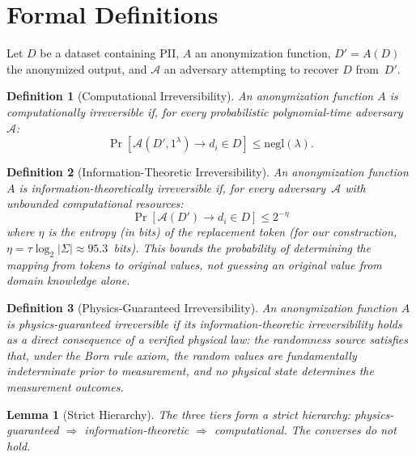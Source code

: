 \documentclass[acmsmall,screen,review,anonymous]{acmart}
\newtheorem{lemma}[theorem]{Lemma}
\newtheorem{definition}{Definition}
\begin{document}
\section{Formal Definitions}
\label{sec:definitions}

Let $D$ be a dataset containing PII, $A$ an anonymization function, $D' = A(D)$ the anonymized output, and $\mathcal{A}$ an adversary attempting to recover $D$ from~$D'$.

\begin{definition}[Computational Irreversibility]
\label{def:comp}
An anonymization function $A$ is \emph{computationally irreversible} if, for every probabilistic polynomial-time adversary $\mathcal{A}$:
\begin{equation}
\Pr[\mathcal{A}(D', 1^\lambda) \to d_i \in D] \leq \mathrm{negl}(\lambda).
\label{eq:comp_irrev}
\end{equation}
\end{definition}

\begin{definition}[Information-Theoretic Irreversibility]
\label{def:it}
An anonymization function~$A$ is \emph{information-theoretically irreversible} if, for every adversary~$\mathcal{A}$ with unbounded computational resources:
\begin{equation}
\Pr[\mathcal{A}(D') \to d_i \in D] \leq 2^{-\eta}
\label{eq:it_irrev}
\end{equation}
where $\eta$ is the entropy (in bits) of the replacement token (for our construction, $\eta = \tau \log_2 |\Sigma| \approx 95.3$~bits). This bounds the probability of determining the \emph{mapping} from tokens to original values, not guessing an original value from domain knowledge alone.
\end{definition}

\begin{definition}[Physics-Guaranteed Irreversibility]
\label{def:phys}
An anonymization function $A$ is \emph{physics-guaranteed irreversible} if its information-theoretic irreversibility holds as a direct consequence of a verified physical law: the randomness source satisfies that, under the Born rule axiom, the random values are fundamentally indeterminate prior to measurement, and no physical state determines the measurement outcomes.
\end{definition}

\begin{lemma}[Strict Hierarchy]
\label{lem:hierarchy}
The three tiers form a strict hierarchy: physics-guaranteed $\Rightarrow$ information-theoretic $\Rightarrow$ computational. The converses do not hold.
\end{lemma}
\end{document}
